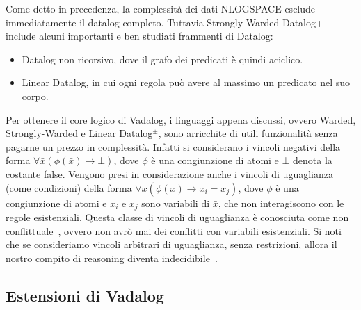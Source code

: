 Come detto in precedenza, la complessità dei dati NLOGSPACE esclude immediatamente il datalog completo. Tuttavia Strongly-Warded Datalog+- include alcuni importanti e ben studiati frammenti di Datalog:
\begin{itemize}
	\item Datalog non ricorsivo, dove il grafo dei predicati è quindi aciclico.
	\item Linear Datalog, in cui ogni regola può avere al massimo un predicato nel suo corpo.
\end{itemize}
Per ottenere il core logico di Vadalog, i linguaggi appena discussi, ovvero Warded, Strongly-Warded e Linear Datalog$^\pm$, sono arricchite di utili funzionalità senza pagarne un prezzo in complessità. \newline
Infatti si considerano i vincoli negativi della forma $\forall \bar{x}(\phi(\bar{x}) \rightarrow \bot)$, dove $\phi$ è una congiunzione di atomi e $\bot$ denota la costante false. Vengono presi in considerazione anche i vincoli di uguaglianza (come condizioni) della forma $\forall \bar{x}(\phi(\bar{x}) \rightarrow x_{i} = x_{j})$, dove $\phi$ è una congiunzione di atomi e $x_{i}$ e $x_{j}$ sono variabili di $\bar{x}$, che non interagiscono con le regole esistenziali. Questa classe di vincoli di uguaglianza è conosciuta come non conflittuale~\cite{cali2012towards}, ovvero non avrò mai dei conflitti con variabili esistenziali. \newline
Si noti che se consideriamo vincoli arbitrari di uguaglianza, senza restrizioni, allora il nostro compito di reasoning diventa indecidibile~\cite{chandra1985implication}.

\subsection{Estensioni di Vadalog}

